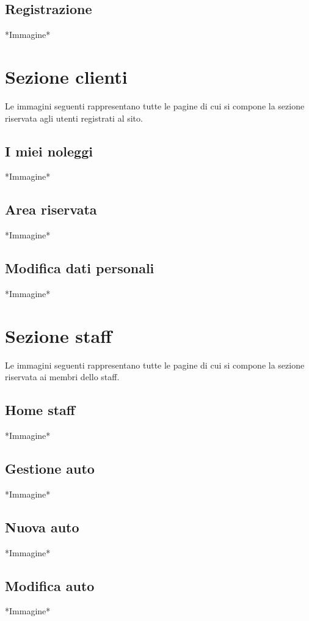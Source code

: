 \documentclass[12pt,a4paperS]{report}
\begin{document}
\begin{normalsize}
			\subsection{Registrazione}
				*Immagine*
		
		\section{Sezione clienti}
			Le immagini seguenti rappresentano tutte le pagine di cui si compone la sezione riservata agli utenti registrati al sito.
			
			\subsection{I miei noleggi}
				*Immagine*
			
			\subsection{Area riservata}
				*Immagine*
			
			\subsection{Modifica dati personali}
				*Immagine*
				
		\section{Sezione staff}
			Le immagini seguenti rappresentano tutte le pagine di cui si compone la sezione riservata ai membri dello staff.
			
			\subsection{Home staff}
				*Immagine*
			
			\subsection{Gestione auto}
				*Immagine*
			
			\subsection{Nuova auto}
				*Immagine*
			
			\subsection{Modifica auto}
				*Immagine*
			

\end{normalsize}
\end{document}
